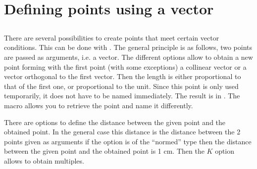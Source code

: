 \section{Defining points using a vector}

\subsection{}

There are several possibilities to create points that meet certain vector
conditions.
This can be done with . The general principle is as
follows, two points are passed as arguments, i.e. a vector. The different
options allow to obtain a new point forming with the first point (with some
exceptions) a collinear vector or a vector orthogonal to the first vector. Then
the length is either proportional to that of the first one, or proportional to
the unit. Since this point is only used temporarily, it does not have to be
named immediately. The result is in . The macro
 allows you to retrieve the point and name it
differently.

There are options to define the distance between the given point and the
obtained point.
In the general case this distance is the distance between the 2 points given as
arguments if the option is of the \enquote{normed} type then the distance between the
given point and the obtained point is 1 cm. Then the $K$ option allows to obtain
multiples.

